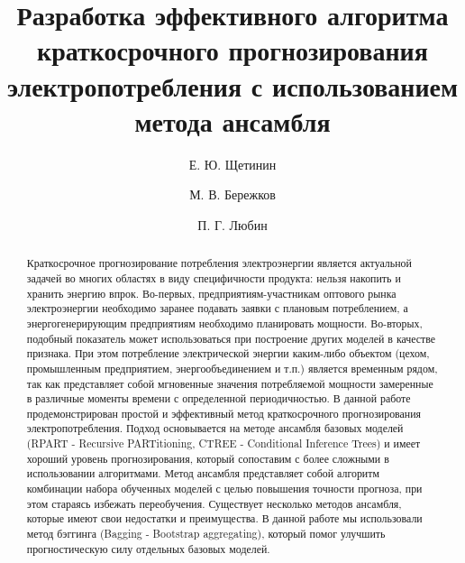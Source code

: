 \documentclass[60x84/16,8pt]{ittmm}
\begin{document}

\title{Разработка эффективного алгоритма краткосрочного прогнозирования
  электропотребления с использованием метода ансамбля}

\author[1]{Е. Ю. Щетинин}
\author[2]{М. В. Бережков}
\author[2]{П. Г. Любин}

\address[1]{Всероссийский научно-исследовательский институт\\
  по проблемам гражданской обороны  и чрезвычайных ситуаций\\
  МЧС России (федеральный центр науки и высоких технологий)\\
  ул. Давыдковская, д.7, Москва, Россия, 121352}
\address[2]{Федеральное государственное бюджетное образовательное учреждение\\
  Высшего образования\\
  Московский государственный технологический университет ``СТАНКИН''\\
  пер. Вадковский, д.3а, Москва, Россия, 127055}


\begin{abstract}
Краткосрочное прогнозирование потребления электроэнергии является актуальной
задачей во многих областях в виду специфичности продукта: нельзя накопить и
хранить энергию впрок. Во-первых, предприятиям-участникам оптового рынка
электроэнергии необходимо заранее подавать заявки с плановым потреблением, а
энергогенерирующим предприятиям необходимо планировать мощности. Во-вторых,
подобный показатель может использоваться при построение других моделей в
качестве признака. При этом потребление электрической энергии каким-либо
объектом (цехом, промышленным предприятием, энергообъединением и т.п.) является
временным рядом, так как представляет собой мгновенные значения потребляемой
мощности замеренные в различные моменты времени с определенной периодичностью. В
данной работе продемонстрирован простой и эффективный метод краткосрочного
прогнозирования электропотребления. Подход основывается на методе ансамбля
базовых моделей (RPART - Recursive PARTitioning, CTREE - Conditional Inference
Trees) и имеет хороший уровень прогнозирования, который сопоставим с более
сложными в использовании алгоритмами. Метод ансамбля представляет собой алгоритм
комбинации набора обученных моделей с целью повышения точности прогноза, при
этом стараясь избежать переобучения. Существует несколько методов ансамбля,
которые имеют свои недостатки и преимущества. В данной работе мы использовали
метод бэггинга (Bagging - Bootstrap aggregating), который помог улучшить
прогностическую силу отдельных базовых моделей.
\end{abstract}
\end{document}
